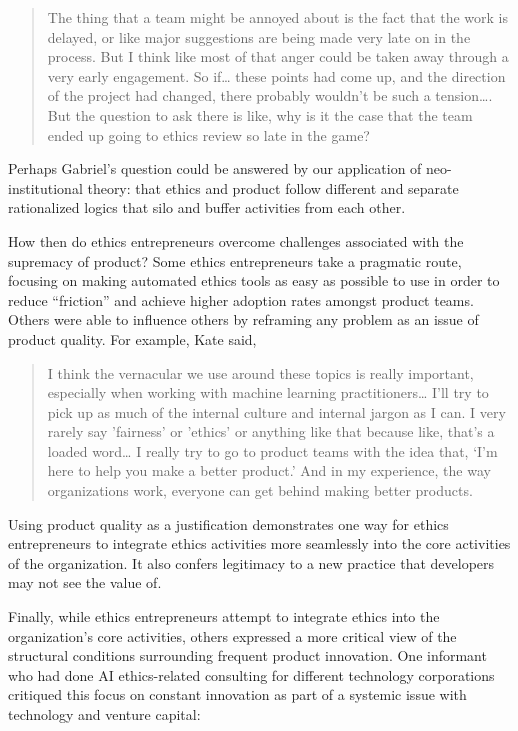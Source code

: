 \documentclass[sigconf]{acmart}
\begin{document}
\begin{quote}
    The thing that a team might be annoyed about is the fact that the work is delayed, or like major suggestions are being made very late on in the process. But I think like most of that anger could be taken away through a very early engagement. So if… these points had come up, and the direction of the project had changed, there probably wouldn't be such a tension…. But the question to ask there is like, why is it the case that the team ended up going to ethics review so late in the game?

\end{quote}

Perhaps Gabriel’s question could be answered by our application of neo-institutional theory: that ethics and product follow different and separate rationalized logics that silo and buffer activities from each other.

How then do ethics entrepreneurs overcome challenges associated with the supremacy of product? Some ethics entrepreneurs take a pragmatic route, focusing on making automated ethics tools as easy as possible to use in order to reduce “friction” and achieve higher adoption rates amongst product teams. Others were able to influence others by reframing any problem as an issue of product quality. For example, Kate said,

\begin{quote}
    I think the vernacular we use around these topics is really important, especially when working with machine learning practitioners… I’ll try to pick up as much of the internal culture and internal jargon as I can. I very rarely say 'fairness' or 'ethics' or anything like that because like, that’s a loaded word…  I really try to go to product teams with the idea that, ‘I'm here to help you make a better product.’ And in my experience, the way organizations work, everyone can get behind making better products.

\end{quote}

Using product quality as a justification demonstrates one way for ethics entrepreneurs to integrate ethics activities more seamlessly into the core activities of the organization. It also confers legitimacy to a new practice that developers may not see the value of.

Finally, while ethics entrepreneurs attempt to integrate ethics into the organization’s core activities, others expressed a more critical view of the structural conditions surrounding frequent product innovation. One informant who had done AI ethics-related consulting for different technology corporations critiqued this focus on constant innovation as part of a systemic issue with technology and venture capital: 
\end{document}
